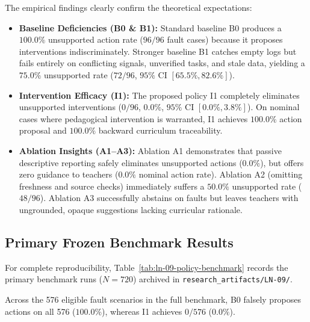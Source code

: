 \documentclass[11pt,a4paper]{article}
\begin{document}
The empirical findings clearly confirm the theoretical expectations:
\begin{itemize}
    \item \textbf{Baseline Deficiencies (B0 \& B1):} Standard baseline B0 produces a $100.0\%$ unsupported action rate ($96/96$ fault cases) because it proposes interventions indiscriminately. Stronger baseline B1 catches empty logs but fails entirely on conflicting signals, unverified tasks, and stale data, yielding a $75.0\%$ unsupported rate ($72/96$, $95\%$ CI $[65.5\%, 82.6\%]$).
    \item \textbf{Intervention Efficacy (I1):} The proposed policy I1 completely eliminates unsupported interventions ($0/96$, $0.0\%$, $95\%$ CI $[0.0\%, 3.8\%]$). On nominal cases where pedagogical intervention is warranted, I1 achieves $100.0\%$ action proposal and $100.0\%$ backward curriculum traceability.
    \item \textbf{Ablation Insights (A1--A3):} Ablation A1 demonstrates that passive descriptive reporting safely eliminates unsupported actions ($0.0\%$), but offers zero guidance to teachers ($0.0\%$ nominal action rate). Ablation A2 (omitting freshness and source checks) immediately suffers a $50.0\%$ unsupported rate ($48/96$). Ablation A3 successfully abstains on faults but leaves teachers with ungrounded, opaque suggestions lacking curricular rationale.
\end{itemize}

\subsection{Primary Frozen Benchmark Results}
For complete reproducibility, Table~\ref{tab:ln-09-policy-benchmark} records the primary benchmark runs ($N=720$) archived in \texttt{research\_artifacts/LN-09/}.



Across the 576 eligible fault scenarios in the full benchmark, B0 falsely proposes actions on all 576 ($100.0\%$), whereas I1 achieves $0/576$ ($0.0\%$).
\end{document}
